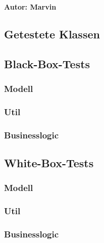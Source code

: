 \textbf{Autor: Marvin}\\

\subsection{Getestete Klassen}

\subsection{Black-Box-Tests}
\subsubsection{Modell}
\subsubsection{Util}
\subsubsection{Businesslogic}

\subsection{White-Box-Tests}
\subsubsection{Modell}
\subsubsection{Util}
\subsubsection{Businesslogic}
